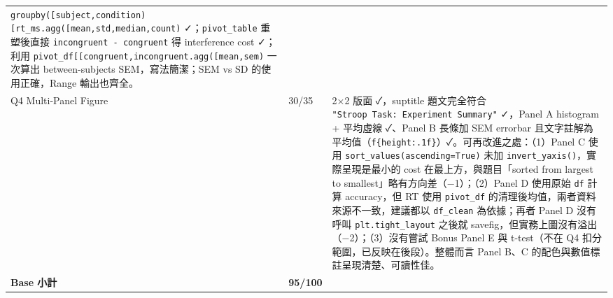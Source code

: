 \documentclass[
  14pt,
]{extarticle}
\begin{document}
\begin{longtable}[]{@{}lll@{}}
\begin{minipage}[t]{0.78\columnwidth}
\texttt{groupby({[}\textquotesingle{}subject\textquotesingle{},\textquotesingle{}condition\textquotesingle{}{]}){[}\textquotesingle{}rt\_ms\textquotesingle{}{]}.agg({[}\textquotesingle{}mean\textquotesingle{},\textquotesingle{}std\textquotesingle{},\textquotesingle{}median\textquotesingle{},\textquotesingle{}count\textquotesingle{}{]})}
✓；\texttt{pivot\_table} 重塑後直接 \texttt{incongruent\ -\ congruent}
得 interference cost ✓；利用
\texttt{pivot\_df{[}{[}\textquotesingle{}congruent\textquotesingle{},\textquotesingle{}incongruent\textquotesingle{}{]}{]}.agg({[}\textquotesingle{}mean\textquotesingle{},\textquotesingle{}sem\textquotesingle{}{]})}
一次算出 between-subjects SEM，寫法簡潔；SEM vs SD 的使用正確，Range
輸出也齊全。\strut
\end{minipage}\tabularnewline
\begin{minipage}[t]{0.10\columnwidth}\raggedright
Q4 Multi-Panel Figure\strut
\end{minipage} & \begin{minipage}[t]{0.04\columnwidth}\raggedright
30/35\strut
\end{minipage} & \begin{minipage}[t]{0.78\columnwidth}\raggedright
2×2 版面 ✓，suptitle 題文完全符合
\texttt{"Stroop\ Task:\ Experiment\ Summary"} ✓，Panel A histogram +
平均虛線 ✓、Panel B 長條加 SEM errorbar
且文字註解為平均值（\texttt{f\textquotesingle{}\{height:.1f\}\textquotesingle{}}）✓。可再改進之處：（1）Panel
C 使用 \texttt{sort\_values(ascending=True)} 未加
\texttt{invert\_yaxis()}，實際呈現是最小的 cost 在最上方，與題目「sorted
from largest to smallest」略有方向差（−1）；（2）Panel D 使用原始
\texttt{df} 計算 accuracy，但 RT 使用 \texttt{pivot\_df}
的清理後均值，兩者資料來源不一致，建議都以 \texttt{df\_clean}
為依據；再者 Panel D 沒有呼叫 \texttt{plt.tight\_layout} 之後就
savefig，但實務上圖沒有溢出（−2）；（3）沒有嘗試 Bonus Panel E 與
t-test（不在 Q4 扣分範圍，已反映在後段）。整體而言 Panel B、C
的配色與數值標註呈現清楚、可讀性佳。\strut
\end{minipage}\tabularnewline
\begin{minipage}[t]{0.10\columnwidth}\raggedright
\textbf{Base 小計}\strut
\end{minipage} & \begin{minipage}[t]{0.04\columnwidth}\raggedright
\textbf{95/100}\strut
\end{minipage} & \begin{minipage}[t]{0.78\columnwidth}\raggedright
\strut
\end{minipage}\tabularnewline

\end{longtable}
\end{document}

